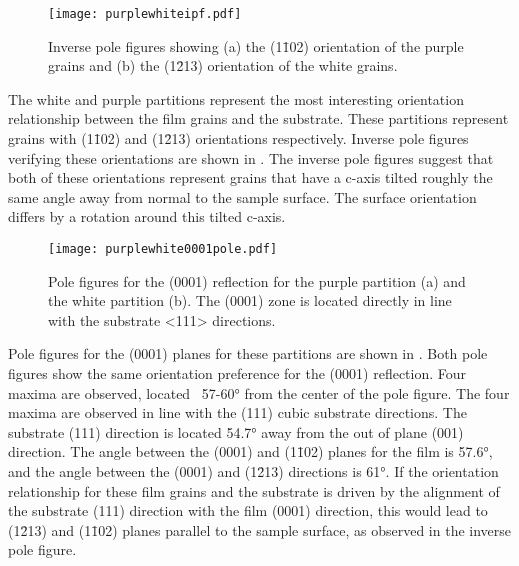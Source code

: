 \begin{figure}
\begin{center}
\texttt{[image: purplewhiteipf.pdf]}
\caption[Inverse pole figures for purple and white grains]{%
	Inverse pole figures showing (a) the (1\={1}02) orientation of the purple 
	grains and (b) the (1\={2}13) orientation of the white grains.}
\label{fig:purplewhiteipf}
\end{center}
\end{figure}
The white and purple partitions represent the most interesting orientation relationship between the film grains and the substrate. These partitions represent grains with (1\={1}02) and (1\={2}13) orientations respectively. Inverse pole figures verifying these orientations are shown in . The inverse pole figures suggest that both of these orientations represent grains that have a c-axis tilted roughly the same angle away from normal to the sample surface. The surface orientation differs by a rotation around this tilted c-axis.

\begin{figure}
\begin{center}
\texttt{[image: purplewhite0001pole.pdf]}
\caption[(0001) pole figures for purple and white grains]{%
	Pole figures for the (0001) reflection for the purple partition (a) 
	and the white partition (b). The (0001) zone is located directly in 
	line with the substrate <111> directions.}
\label{fig:purplewhite0001pole}
\end{center}
\end{figure}
Pole figures for the (0001) planes for these partitions are shown in . Both pole figures show the same orientation preference for the (0001) reflection. Four maxima are observed, located ~57-60\si{\degree} from the center of the pole figure. The four maxima are observed in line with the (111) cubic substrate directions. The substrate (111) direction is located 54.7\si{\degree} away from the out of plane (001) direction. The angle between the (0001) and (1\={1}02) planes for the  film is 57.6\si{\degree}, and the angle between the (0001) and (1\={2}13) directions is 61\si{\degree}. If the orientation relationship for these film grains and the substrate is driven by the alignment of the substrate (111) direction with the film (0001) direction, this would lead to (1\={2}13) and (1\={1}02) planes parallel to the sample surface, as observed in the inverse pole figure. 

